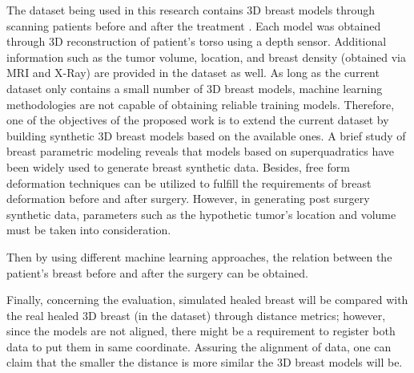 The dataset being used in this research contains 3D breast models through scanning patients before and after the treatment . Each model was obtained through 3D reconstruction of patient's torso using a depth sensor. Additional information such as the tumor volume, location, and breast density (obtained via MRI and X-Ray) are provided in the dataset as well. As long as the current dataset only contains a small number of 3D breast models, machine learning methodologies are not capable of obtaining reliable training models. Therefore, one of the objectives of the proposed work is to extend the current dataset by building synthetic 3D breast models based on the available ones. A brief study of breast parametric modeling reveals that models based on superquadratics have been widely used to generate breast synthetic data. Besides, free form deformation techniques can be utilized to fulfill the requirements of breast deformation before and after surgery. However, in generating post surgery synthetic data, parameters such as the hypothetic tumor’s location and volume must be taken into consideration. 


Then by using different machine learning approaches, the relation between the patient’s breast before and after the surgery can be obtained.  


Finally, concerning the evaluation, simulated healed breast will be compared with the real healed 3D breast (in the dataset) through distance metrics; however, since the models are not aligned, there might be a requirement to register both data to put them in same coordinate. Assuring the alignment of data, one can claim that the smaller the distance is more similar the 3D breast models will be.